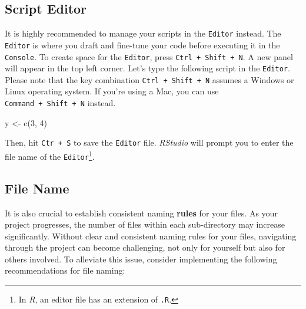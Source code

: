 \documentclass[
]{book}
\newenvironment{Shaded}{\begin{snugshade}}{\end{snugshade}}
\newcommand{\DecValTok}[1]{\textcolor[rgb]{0.00,0.00,0.81}{#1}}
\newcommand{\FunctionTok}[1]{\textcolor[rgb]{0.00,0.00,0.00}{#1}}
\newcommand{\NormalTok}[1]{#1}
\newcommand{\OtherTok}[1]{\textcolor[rgb]{0.56,0.35,0.01}{#1}}
\begin{document}
\hypertarget{script-editor}{%
\subsection{Script Editor}\label{script-editor}}

It is highly recommended to manage your scripts in the \texttt{Editor} instead. The \texttt{Editor} is where you draft and fine-tune your code before executing it in the \texttt{Console}. To create space for the \texttt{Editor}, press \texttt{Ctrl\ +\ Shift\ +\ N}. A new panel will appear in the top left corner. Let's type the following script in the \texttt{Editor}. Please note that the key combination \texttt{Ctrl\ +\ Shift\ +\ N} assumes a Windows or Linux operating system. If you're using a Mac, you can use \texttt{Command\ +\ Shift\ +\ N} instead.

\begin{Shaded}
\begin{Highlighting}[]
\NormalTok{y }\OtherTok{\textless{}{-}} \FunctionTok{c}\NormalTok{(}\DecValTok{3}\NormalTok{, }\DecValTok{4}\NormalTok{)}
\end{Highlighting}
\end{Shaded}

Then, hit \texttt{Ctr\ +\ S} to save the \texttt{Editor} file. \emph{RStudio} will prompt you to enter the file name of the \texttt{Editor}\footnote{In \emph{R}, an editor file has an extension of \texttt{.R}.}.

\hypertarget{file-name}{%
\subsection{File Name}\label{file-name}}

It is also crucial to establish consistent naming \textbf{rules} for your files. As your project progresses, the number of files within each sub-directory may increase significantly. Without clear and consistent naming rules for your files, navigating through the project can become challenging, not only for yourself but also for others involved. To alleviate this issue, consider implementing the following recommendations for file naming:
\end{document}
